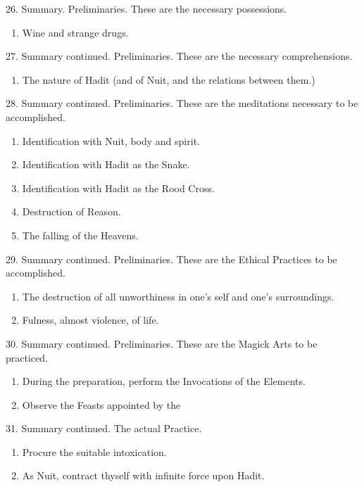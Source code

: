 26. Summary. Preliminaries. These are the necessary possessions.
\begin{enumerate}[leftmargin=4\parindent]
\item Wine and strange drugs.
\end{enumerate}

27. Summary continued. Preliminaries. These are the necessary comprehensions.

\begin{enumerate}[leftmargin=4\parindent]
\item The nature of Hadit (and of Nuit, and the relations between them.)
\end{enumerate}

28. Summary continued. Preliminaries. These are the meditations necessary to be accomplished.

\begin{enumerate}[leftmargin=4\parindent]

\item Identification with Nuit, body and spirit.
\item Identification with Hadit as the Snake.
\item Identification with Hadit as the Rood Cross.
\item Destruction of Reason.
\item The falling of the Heavens.
\end{enumerate}

29. Summary continued. Preliminaries. These are the Ethical Practices to be accomplished.
\begin{enumerate}[leftmargin=4\parindent]
\item The destruction of all unworthiness in one's self and one's surroundings.
\item Fulness, almost violence, of life.
\end{enumerate}

30. Summary continued. Preliminaries. These are the Magick Arts to be practiced.
\begin{enumerate}[leftmargin=4\parindent]
\item During the preparation, perform the Invocations of the Elements.
\item Observe the Feasts appointed by the \Argentium{}
\end{enumerate}

31. Summary continued. The actual Practice.

\begin{enumerate}[leftmargin=4\parindent]
\item Procure the suitable intoxication.
\item As Nuit, contract thyself with infinite force upon Hadit.
\end{enumerate}

